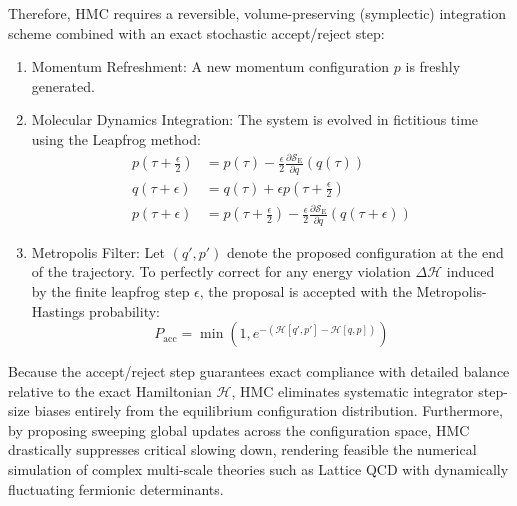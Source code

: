 Therefore, HMC requires a reversible, volume-preserving (symplectic) integration scheme combined with an exact stochastic accept/reject step:
\begin{enumerate}
    \item Momentum Refreshment: A new momentum configuration $p$ is freshly generated.
    \item Molecular Dynamics Integration: The system is evolved in fictitious time using the Leapfrog method:
\begin{align}
p\left(\tau + \frac{\epsilon}{2}\right) &= p(\tau) - \frac{\epsilon}{2} \frac{\partial \mathcal{S}_{\mathrm{E}}}{\partial q}(q(\tau)) \\
q(\tau + \epsilon) &= q(\tau) + \epsilon p\left(\tau + \frac{\epsilon}{2}\right) \\
p\left(\tau + \epsilon\right) &= p\left(\tau + \frac{\epsilon}{2}\right) - \frac{\epsilon}{2} \frac{\partial \mathcal{S}_{\mathrm{E}}}{\partial q}(q(\tau + \epsilon))
\end{align}
\item Metropolis Filter: Let $(q', p')$ denote the proposed configuration at the end of the trajectory. To perfectly correct for any energy violation $\Delta \mathcal{H}$ induced by the finite leapfrog step $\epsilon$, the proposal is accepted with the Metropolis-Hastings probability:
\begin{equation}
P_{\mathrm{acc}} = \min\left(1, e^{-(\mathcal{H}[q', p'] - \mathcal{H}[q, p])}\right)
\end{equation}
\end{enumerate}
Because the accept/reject step guarantees exact compliance with detailed balance relative to the exact Hamiltonian $\mathcal{H}$, HMC eliminates systematic integrator step-size biases entirely from the equilibrium configuration distribution. Furthermore, by proposing sweeping global updates across the configuration space, HMC drastically suppresses critical slowing down, rendering feasible the numerical simulation of complex multi-scale theories such as Lattice QCD with dynamically fluctuating fermionic determinants.


